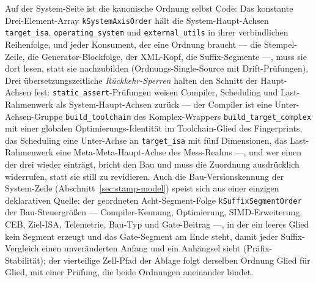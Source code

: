 \begin{nurlang}
Auf der System-Seite ist die kanonische Ordnung selbst Code: Das konstante Drei-Element-Array
\texttt{kSystemAxisOrder} hält die System-Haupt-Achsen \texttt{target\_isa}, \texttt{operating\_system} und
\texttt{external\_utils} in ihrer verbindlichen Reihenfolge, und jeder Konsument, der eine Ordnung
braucht --- die Stempel-Zeile, die Generator-Blockfolge, der XML-Kopf, die Suffix-Segmente ---,
muss sie dort lesen, statt sie nachzubilden (Ordnungs-Single-Source mit Drift-Prüfungen). Drei
übersetzungszeitliche \emph{Rückkehr-Sperren} halten den Schnitt der Haupt-Achsen fest:
\texttt{static\_assert}-Prüfungen weisen Compiler, Scheduling und Last-Rahmenwerk als System-Haupt-Achsen
zurück --- der Compiler ist eine Unter-Achsen-Gruppe \texttt{build\_toolchain} des Komplex-Wrappers
\texttt{build\_target\_complex} mit einer globalen Optimierungs-Identität im Toolchain-Glied des
Fingerprints, das Scheduling eine Unter-Achse an \texttt{target\_isa} mit fünf Dimensionen, das
Last-Rahmenwerk eine Meta-Meta-Haupt-Achse des Mess-Realms ---, und wer einen der drei wieder einträgt,
bricht den Bau und muss die Zuordnung ausdrücklich widerrufen, statt sie still zu revidieren. Auch die
Bau-Versionskennung der System-Zeile (Abschnitt~\ref{sec:stamp-model}) speist sich aus einer einzigen
deklarativen Quelle: der geordneten Acht-Segment-Folge \texttt{kSuffixSegmentOrder} der
Bau-Steuergrößen --- Compiler-Kennung, Optimierung, SIMD-Erweiterung, CEB, Ziel-ISA, Telemetrie, Bau-Typ und
Gate-Beitrag ---, in der ein leeres Glied kein Segment erzeugt und das Gate-Segment am Ende steht, damit
jeder Suffix-Vergleich einen unveränderten Anfang und ein Anhängsel sieht (Präfix-Stabilität); der
vierteilige Zell-Pfad der Ablage folgt derselben Ordnung Glied für Glied, mit einer Prüfung, die beide
Ordnungen aneinander bindet.
\end{nurlang}
